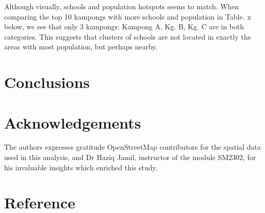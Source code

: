 \documentclass [12 pt]{article}
\begin{document}
Although visually, schools and population hotspots seems to match. When comparing the top 10 kampongs with more schools and population in Table. x below, we see that only 3 kampongs: Kampong A, Kg. B, Kg. C are in both categories. This suggests that clusters of schools are not located in exactly the areas with most population, but perhaps nearby. 


\section{Conclusions}

\section{Acknowledgements}
 The authors expresses gratitude OpenStreetMap contributors for the spatial data used in this analysis, and Dr Haziq Jamil, instructor of the module SM2302, for his invaluable insights
 which enriched this study.
 
\section{Reference}
\end{document}
